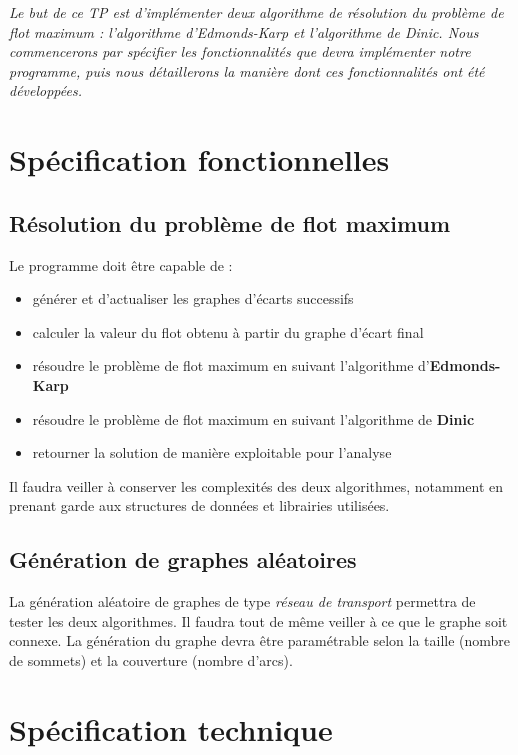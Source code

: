 \textit{Le but de ce TP est d'implémenter deux algorithme de résolution du problème de flot maximum : l'algorithme d'Edmonds-Karp et l'algorithme de Dinic. Nous commencerons par spécifier les fonctionnalités que devra implémenter notre programme, puis nous détaillerons la manière dont ces fonctionnalités ont été développées.}

\section{Spécification fonctionnelles}

\subsection{Résolution du problème de flot maximum}

Le programme doit être capable de :
\begin{itemize}
\item générer et d'actualiser les graphes d'écarts successifs
\item calculer la valeur du flot obtenu à partir du graphe d'écart final
\item résoudre le problème de flot maximum en suivant l'algorithme d'\textbf{Edmonds-Karp}
\item résoudre le problème de flot maximum en suivant l'algorithme de \textbf{Dinic}
\item retourner la solution de manière exploitable pour l'analyse
\end{itemize}

Il faudra veiller à conserver les complexités des deux algorithmes, notamment en prenant garde aux structures de données et librairies utilisées.

\subsection{Génération de graphes aléatoires}

La génération aléatoire de graphes de type \emph{réseau de transport} permettra de tester les deux algorithmes. Il faudra tout de même veiller à ce que le graphe soit connexe. La génération du graphe devra être paramétrable selon la taille (nombre de sommets) et la couverture (nombre d'arcs).

\section{Spécification technique}

